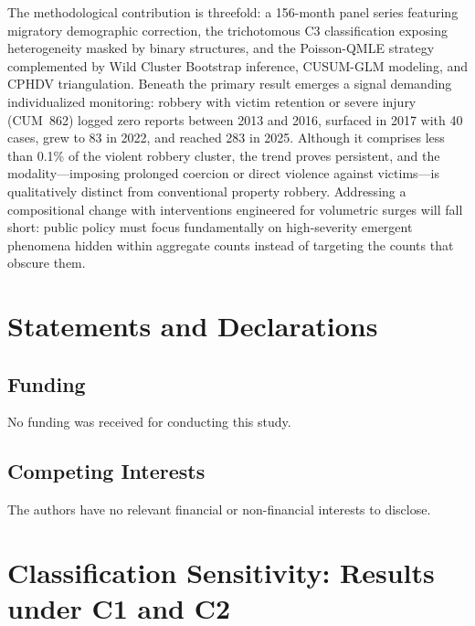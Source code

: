 \documentclass[pdflatex,sn-basic]{sn-jnl}
\begin{document}
The methodological contribution is threefold: a 156-month panel series featuring migratory demographic correction, the trichotomous C3 classification exposing heterogeneity masked by binary structures, and the Poisson-QMLE strategy complemented by Wild Cluster Bootstrap inference, CUSUM-GLM modeling, and CPHDV triangulation. Beneath the primary result emerges a signal demanding individualized monitoring: robbery with victim retention or severe injury (CUM~862) logged zero reports between 2013 and 2016, surfaced in 2017 with 40 cases, grew to 83 in 2022, and reached 283 in 2025. Although it comprises less than 0.1\% of the violent robbery cluster, the trend proves persistent, and the modality---imposing prolonged coercion or direct violence against victims---is qualitatively distinct from conventional property robbery. Addressing a compositional change with interventions engineered for volumetric surges will fall short: public policy must focus fundamentally on high-severity emergent phenomena hidden within aggregate counts instead of targeting the counts that obscure them.

\section*{Statements and Declarations}

\subsection*{Funding}
No funding was received for conducting this study.

\subsection*{Competing Interests}
The authors have no relevant financial or non-financial interests to disclose.

\renewcommand{\refname}{References}


\clearpage
\appendix

\section{Classification Sensitivity: Results under C1 and C2}
\label{ap:clasif}
\end{document}
